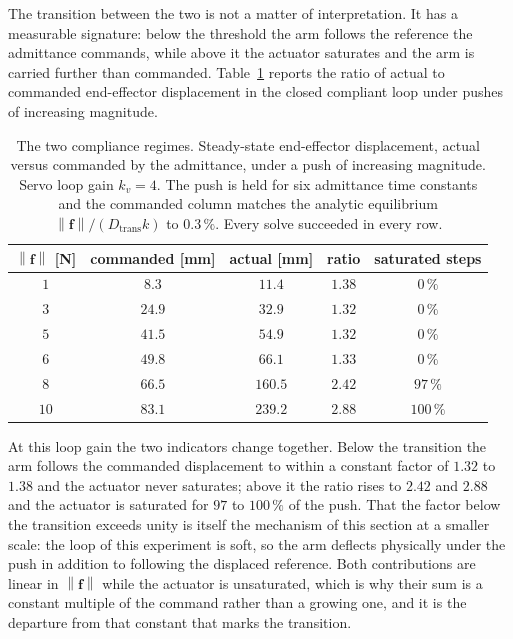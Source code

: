 \documentclass{ieeeaccess}
\newcommand{\norm}[1]{\left\| #1 \right\|}
\begin{document}
The transition between the two is not a matter of interpretation. It has a
measurable signature: below the threshold the arm follows the reference the
admittance commands, while above it the actuator saturates and the arm is carried
further than commanded. Table~\ref{tab:regimes} reports the ratio of actual to
commanded end-effector displacement in the closed compliant loop under pushes of
increasing magnitude.

\begin{table}[!t]
\caption{The two compliance regimes. Steady-state end-effector displacement,
actual versus commanded by the admittance, under a push of increasing magnitude.
Servo loop gain $k_v=4$. The push is held for six admittance time constants and
the commanded column matches the analytic equilibrium
$\norm{\bm f}/(D_{\mathrm{trans}}k)$ to $0.3\,\%$. Every solve succeeded in every
row.}
\label{tab:regimes}
\centering
\footnotesize
\setlength{\tabcolsep}{5pt}
\begin{tabular}{ccccc}
\toprule
$\norm{\bm f}$ [N] & commanded [mm] & actual [mm] & ratio & saturated steps\\
\midrule
$1$  & $8.3$   & $11.4$  & $1.38$ & $0\,\%$\\
$3$  & $24.9$  & $32.9$  & $1.32$ & $0\,\%$\\
$5$  & $41.5$  & $54.9$  & $1.32$ & $0\,\%$\\
$6$  & $49.8$  & $66.1$  & $1.33$ & $0\,\%$\\
\midrule
$8$  & $66.5$  & $160.5$ & $2.42$ & $97\,\%$\\
$10$ & $83.1$  & $239.2$ & $2.88$ & $100\,\%$\\
\bottomrule
\end{tabular}
\end{table}

At this loop gain the two indicators change together. Below the transition the arm follows the
commanded displacement to within a constant factor of $1.32$ to $1.38$ and the
actuator never saturates; above it the ratio rises to $2.42$ and $2.88$ and the
actuator is saturated for $97$ to $100\,\%$ of the push. That the factor below
the transition exceeds unity is itself the mechanism of this section at a smaller
scale: the loop of this experiment is soft, so the arm deflects physically under
the push in addition to following the displaced reference. Both contributions are
linear in $\norm{\bm f}$ while the actuator is unsaturated, which is why their
sum is a constant multiple of the command rather than a growing one, and it is
the departure from that constant that marks the transition.
\end{document}
